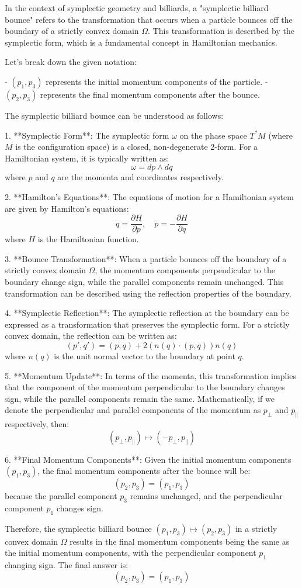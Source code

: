 In the context of symplectic geometry and billiards, a "symplectic billiard bounce" refers to the transformation that occurs when a particle bounces off the boundary of a strictly convex domain \(\Omega\). This transformation is described by the symplectic form, which is a fundamental concept in Hamiltonian mechanics.

Let's break down the given notation:

- \((p_1, p_3)\) represents the initial momentum components of the particle.
- \((p_2, p_3)\) represents the final momentum components after the bounce.

The symplectic billiard bounce can be understood as follows:

1. **Symplectic Form**: The symplectic form \(\omega\) on the phase space \(T^*M\) (where \(M\) is the configuration space) is a closed, non-degenerate 2-form. For a Hamiltonian system, it is typically written as:
   \[
   \omega = dp \wedge dq
   \]
   where \(p\) and \(q\) are the momenta and coordinates respectively.

2. **Hamilton's Equations**: The equations of motion for a Hamiltonian system are given by Hamilton's equations:
   \[
   \dot{q} = \frac{\partial H}{\partial p}, \quad \dot{p} = -\frac{\partial H}{\partial q}
   \]
   where \(H\) is the Hamiltonian function.

3. **Bounce Transformation**: When a particle bounces off the boundary of a strictly convex domain \(\Omega\), the momentum components perpendicular to the boundary change sign, while the parallel components remain unchanged. This transformation can be described using the reflection properties of the boundary.

4. **Symplectic Reflection**: The symplectic reflection at the boundary can be expressed as a transformation that preserves the symplectic form. For a strictly convex domain, the reflection can be written as:
   \[
   (p', q') = (p, q) + 2 \left( n(q) \cdot (p, q) \right) n(q)
   \]
   where \(n(q)\) is the unit normal vector to the boundary at point \(q\).

5. **Momentum Update**: In terms of the momenta, this transformation implies that the component of the momentum perpendicular to the boundary changes sign, while the parallel components remain the same. Mathematically, if we denote the perpendicular and parallel components of the momentum as \(p_\perp\) and \(p_\parallel\) respectively, then:
   \[
   (p_\perp, p_\parallel) \mapsto (-p_\perp, p_\parallel)
   \]

6. **Final Momentum Components**: Given the initial momentum components \((p_1, p_3)\), the final momentum components after the bounce will be:
   \[
   (p_2, p_3) = (p_1, p_3)
   \]
   because the parallel component \(p_3\) remains unchanged, and the perpendicular component \(p_1\) changes sign.

Therefore, the symplectic billiard bounce \((p_1, p_3) \mapsto (p_2, p_3)\) in a strictly convex domain \(\Omega\) results in the final momentum components being the same as the initial momentum components, with the perpendicular component \(p_1\) changing sign. The final answer is:
\[
(p_2, p_3) = (p_1, p_3)
\]